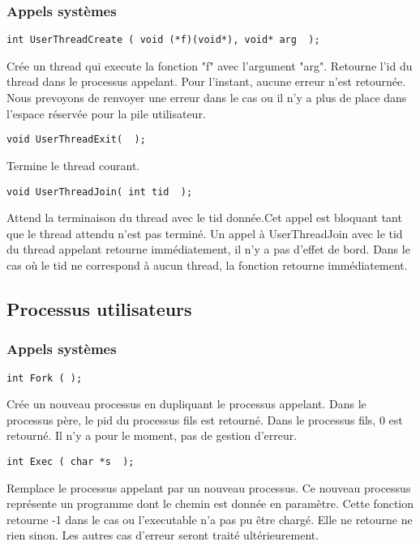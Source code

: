 \documentclass{article}
\begin{document}
\subsubsection{Appels systèmes}

\begin{verbatim}
int UserThreadCreate ( void (*f)(void*), void* arg  );
\end{verbatim}
Crée un thread qui execute la fonction "f" avec l'argument "arg". Retourne l'id du thread dans le processus appelant. Pour l'instant, aucune erreur n'est retournée. Nous prevoyons de renvoyer une erreur dans le cas ou il n'y a plus de place dans l'espace réservée pour la pile utilisateur.

\begin{verbatim}
void UserThreadExit(  );
\end{verbatim}
Termine le thread courant.

\begin{verbatim}
void UserThreadJoin( int tid  );
\end{verbatim}
Attend la terminaison du thread avec le tid donnée.Cet appel est bloquant tant que le thread attendu n'est pas terminé.  Un appel à UserThreadJoin avec le tid du thread appelant retourne immédiatement, il n'y a pas d'effet de bord. Dans le cas où le tid ne correspond à aucun thread, la fonction retourne immédiatement.

\subsection{Processus utilisateurs}
\subsubsection{Appels systèmes}

\begin{verbatim}
int Fork ( );
\end{verbatim}
Crée un nouveau processus en dupliquant le processus appelant. Dans le processus père, le pid du processus fils est retourné. Dans le processus fils, 0 est retourné.
Il n'y a pour le moment, pas de gestion d'erreur.

\begin{verbatim}
int Exec ( char *s  );
\end{verbatim}
Remplace le processus appelant par un nouveau processus. Ce nouveau processus représente un programme dont le chemin est donnée en paramètre.
Cette fonction retourne -1 dans le cas ou l'executable n'a pas pu être chargé. Elle ne retourne ne rien sinon. Les autres cas d'erreur seront traité ultérieurement.
\end{document}
